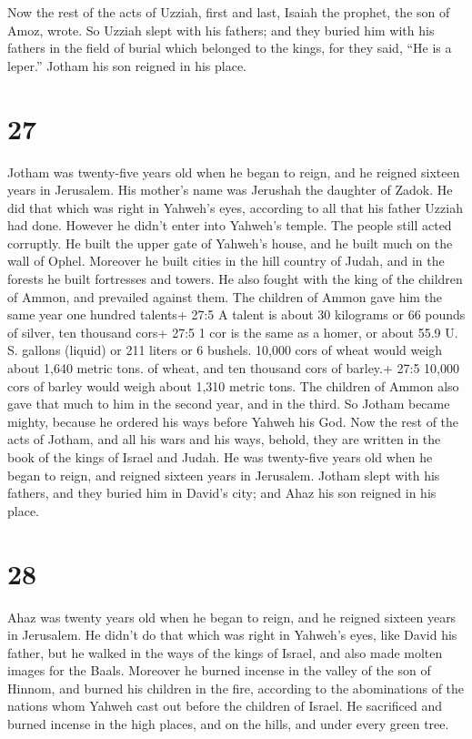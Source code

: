  Now the rest of the acts of Uzziah, first and last, Isaiah
the prophet, the son of Amoz, wrote.  So Uzziah slept with
his fathers; and they buried him with his fathers in the field of burial
which belonged to the kings, for they said, ``He is a leper.'' Jotham
his son reigned in his place.

\hypertarget{section-26}{%
\section{27}\label{section-26}}

 Jotham was twenty-five years old when he began to reign,
and he reigned sixteen years in Jerusalem. His mother's name was
Jerushah the daughter of Zadok.  He did that which was right
in Yahweh's eyes, according to all that his father Uzziah had done.
However he didn't enter into Yahweh's temple. The people still acted
corruptly.  He built the upper gate of Yahweh's house, and
he built much on the wall of Ophel.  Moreover he built
cities in the hill country of Judah, and in the forests he built
fortresses and towers.  He also fought with the king of the
children of Ammon, and prevailed against them. The children of Ammon
gave him the same year one hundred talents+ 27:5 A talent is about 30
kilograms or 66 pounds of silver, ten thousand cors+ 27:5 1 cor is the
same as a homer, or about 55.9 U. S. gallons (liquid) or 211 liters or 6
bushels. 10,000 cors of wheat would weigh about 1,640 metric tons. of
wheat, and ten thousand cors of barley.+ 27:5 10,000 cors of barley
would weigh about 1,310 metric tons. The children of Ammon also gave
that much to him in the second year, and in the third.  So
Jotham became mighty, because he ordered his ways before Yahweh his God.
 Now the rest of the acts of Jotham, and all his wars and
his ways, behold, they are written in the book of the kings of Israel
and Judah.  He was twenty-five years old when he began to
reign, and reigned sixteen years in Jerusalem.  Jotham slept
with his fathers, and they buried him in David's city; and Ahaz his son
reigned in his place.

\hypertarget{section-27}{%
\section{28}\label{section-27}}

 Ahaz was twenty years old when he began to reign, and he
reigned sixteen years in Jerusalem. He didn't do that which was right in
Yahweh's eyes, like David his father,  but he walked in the
ways of the kings of Israel, and also made molten images for the Baals.
 Moreover he burned incense in the valley of the son of
Hinnom, and burned his children in the fire, according to the
abominations of the nations whom Yahweh cast out before the children of
Israel.  He sacrificed and burned incense in the high
places, and on the hills, and under every green tree.

